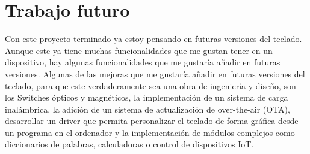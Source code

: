 \section{Trabajo futuro}
Con este proyecto terminado ya estoy pensando en futuras versiones del teclado. Aunque este ya tiene muchas funcionalidades que me gustan tener en un dispositivo, hay algunas funcionalidades que me gustaría añadir en futuras versiones. Algunas de las mejoras que me gustaría añadir en futuras versiones del teclado, para que este verdaderamente sea una obra de ingeniería y diseño, son los \gls{Switches} ópticos y magnéticos, la implementación de un sistema de carga inalámbrica, la adición de un sistema de actualización de  over-the-air (OTA), desarrollar un driver que permita personalizar el teclado de forma gráfica desde un programa en el ordenador y la implementación de módulos complejos como diccionarios de palabras, calculadoras o control de dispositivos \gls{IoT}.